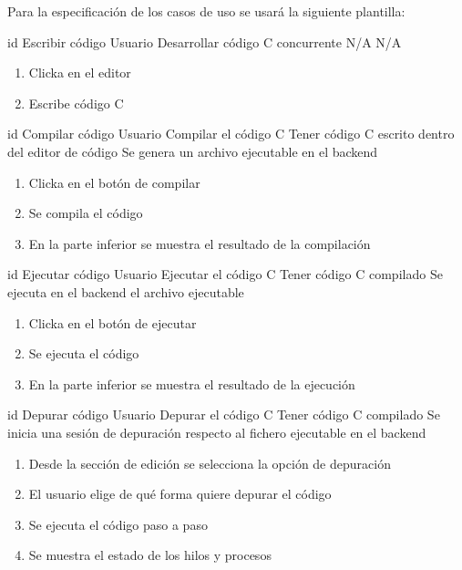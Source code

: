 
Para la especificación de los casos de uso se usará la siguiente plantilla:

\printuctemplate{}

\begin{useCase}{id}
    {Escribir código} %
    {Usuario} %
    {Desarrollar código C concurrente}  %
    {N/A}  %
    {N/A} %
    \begin{enumerate} %
        \item Clicka en el editor
        \item Escribe código C 
    \end{enumerate}
\end{useCase}

\begin{useCase}{id}
    {Compilar código}
    {Usuario}
    {Compilar el código C}
    {Tener código C escrito dentro del editor de código}
    {Se genera un archivo ejecutable en el backend}
    \begin{enumerate}
        \item Clicka en el botón de compilar
        \item Se compila el código
        \item En la parte inferior se muestra el resultado de la compilación
    \end{enumerate}
\end{useCase}

\begin{useCase}{id}
    {Ejecutar código}
    {Usuario}
    {Ejecutar el código C}
    {Tener código C compilado}
    {Se ejecuta en el backend el archivo ejecutable}
    \begin{enumerate}
        \item Clicka en el botón de ejecutar
        \item Se ejecuta el código
        \item En la parte inferior se muestra el resultado de la ejecución
    \end{enumerate}
\end{useCase}

\begin{useCase}{id}
    {Depurar código}
    {Usuario}
    {Depurar el código C}
    {Tener código C compilado}
    {Se inicia una sesión de depuración respecto al fichero ejecutable en el backend}
    \begin{enumerate}
        \item Desde la sección de edición se selecciona la opción de depuración
        \item El usuario elige de qué forma quiere \gls{depurar} el código
        \item Se ejecuta el código paso a paso
        \item Se muestra el estado de los \glspl{hilo} y procesos
    \end{enumerate}
\end{useCase}

